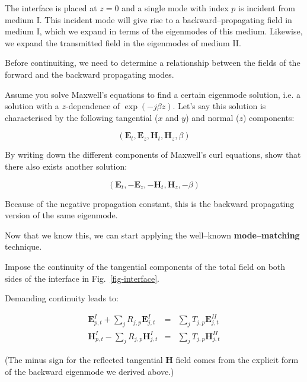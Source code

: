 The interface is placed at $z=0$ and a single mode with index $p$ is incident from medium I. This incident mode will give rise to a backward--propagating field in medium I, which we expand in terms of the eigenmodes of this medium. Likewise, we expand the transmitted field in the eigenmodes of medium II.

Before continuiting, we need to determine a relationship between the fields of the forward and the backward propagating modes.

\begin{exer}
Assume you solve Maxwell's equations to find a certain eigenmode solution, i.e. a solution with a $z$-dependence of $\exp{(-j \beta z)}$. Let's say this solution is characterised by the following tangential ($x$ and $y$) and normal ($z$) components:

$$\left( \mathbf{E}_{t},\mathbf{E}_{z},\mathbf{H}_{t},\mathbf{H}_{z},\beta \right)$$

By writing down the different components of Maxwell's curl equations, show that there also exists another solution:

$$  \left( \mathbf{E}_{t},-\mathbf{E}_{z},-\mathbf{H}_{t},\mathbf{H}_{z},-\beta \right) $$

Because of the negative propagation constant, this is the backward propagating version of the same eigenmode.

\end{exer}

Now that we know this, we can start applying the well--known \textbf{mode--matching} technique.

\begin{cue}
Impose the continuity of the tangential components of the total field on both sides of the interface in Fig.~\ref{fig-interface}.  
\end{cue}

Demanding continuity leads to: 

\begin{eqnarray}
\mathbf{E}^{I}_{p,t}+\sum _{j}R_{j,p}\mathbf{E}^{I}_{j,t} & = & \sum _{j}T_{j,p}\mathbf{E}^{II}_{j,t}\label{Eq:MM 1a} \\
\mathbf{H}^{I}_{p,t}-\sum _{j}R_{j,p}\mathbf{H}^{I}_{j,t} & = & \sum _{j}T_{j,p}\mathbf{H}^{II}_{j,t}\label{Eq:MM 1b} 
\end{eqnarray}

(The minus sign for the reflected tangential ${\mathbf H}$ field comes from the explicit form of the backward eigenmode we derived above.)

